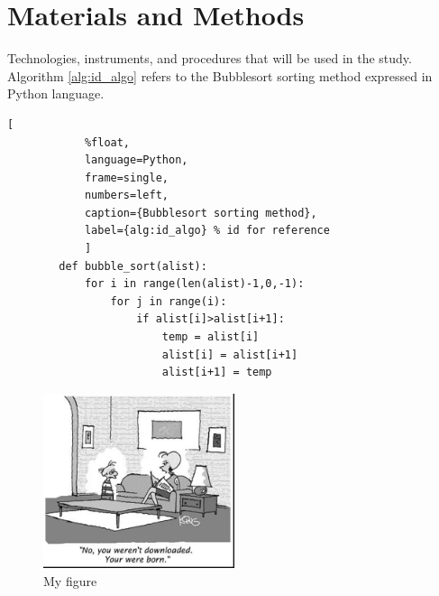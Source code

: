     \section{Materials and Methods}
        Technologies, instruments, and procedures that will be used in the study. Algorithm \ref{alg:id_algo} refers to the Bubblesort sorting method expressed in Python language.
    
        \begin{lstlisting}[  
            %float,
            language=Python, 
            frame=single, 
            numbers=left,
            caption={Bubblesort sorting method},
            label={alg:id_algo} % id for reference
            ]        
        def bubble_sort(alist):
            for i in range(len(alist)-1,0,-1):
                for j in range(i):
                    if alist[i]>alist[i+1]:
                        temp = alist[i]
                        alist[i] = alist[i+1]
                        alist[i+1] = temp    
        \end{lstlisting}
    
        \begin{figure}[H]
            \centering
            \includegraphics[width=0.5\textwidth]{fig1.jpg} %
            \caption{My figure}
            \label{fig:id_figura}
        \end{figure}
        
